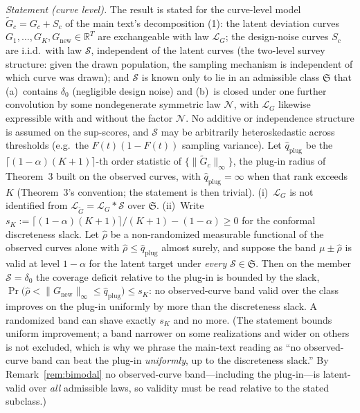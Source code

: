 \documentclass[12pt]{article}
\theoremstyle{definition}
\theoremstyle{remark}
\newcommand{\Gtilde}{\widetilde{G}}
\begin{document}
\emph{Statement (curve level).} The result is stated for the curve-level model
$\Gtilde_c=G_c+S_c$ of the main text's decomposition (1): the latent
deviation curves $G_1,\dots,G_K,G_{\text{new}}\in\mathbb R^T$ are exchangeable
with law $\mathcal L_G$; the design-noise curves $S_c$ are i.i.d.\ with law
$\mathcal S$, independent of the latent curves (the two-level survey
structure: given the drawn population, the sampling mechanism is independent
of which curve was drawn); and $\mathcal S$ is known only to lie in an
admissible class $\mathfrak S$ that (a)~contains $\delta_0$ (negligible design
noise) and (b)~is closed under one further convolution by some nondegenerate
symmetric law $\mathcal N$, with $\mathcal L_G$ likewise expressible with and
without the factor $\mathcal N$. No additive or independence structure is
assumed on the sup-scores, and $\mathcal S$ may be arbitrarily heteroskedastic
across thresholds (e.g.\ the $F(t)(1-F(t))$ sampling variance). Let
$\widehat q_{\text{plug}}$ be the $\lceil(1-\alpha)(K{+}1)\rceil$-th order
statistic of $\{\lVert\Gtilde_c\rVert_\infty\}$, the plug-in radius of
Theorem~3 built on the observed curves, with $\widehat q_{\text{plug}}=\infty$
when that rank exceeds $K$ (Theorem~3's convention; the statement is then
trivial).
(i)~$\mathcal L_G$ is not identified from
$\mathcal L_{\Gtilde}=\mathcal L_G*\mathcal S$ over $\mathfrak S$.
(ii)~Write $s_K:=\lceil(1-\alpha)(K{+}1)\rceil/(K{+}1)-(1-\alpha)\ge0$ for the
conformal discreteness slack. Let $\widehat\rho$ be a non-randomized
measurable functional of the observed curves alone with
$\widehat\rho\le\widehat q_{\text{plug}}$ almost surely, and suppose the band
$\mu\pm\widehat\rho$ is valid at level $1-\alpha$ for the latent target under
\emph{every} $\mathcal S\in\mathfrak S$. Then on the member
$\mathcal S=\delta_0$ the coverage deficit relative to the plug-in is bounded
by the slack,
$\Pr\big(\widehat\rho<\lVert G_{\text{new}}\rVert_\infty\le
\widehat q_{\text{plug}}\big)\le s_K$: no observed-curve band valid over the
class improves on the plug-in uniformly by more than the discreteness slack.
A randomized band can shave exactly $s_K$ and no more. (The statement bounds
uniform improvement; a band narrower on some realizations and wider on others
is not excluded, which is why we phrase the main-text reading as ``no
observed-curve band can beat the plug-in \emph{uniformly}, up to the
discreteness slack.'' By Remark~\ref{rem:bimodal} no observed-curve
band---including the plug-in---is latent-valid over \emph{all} admissible
laws, so validity must be read relative to the stated subclass.)
\end{document}

